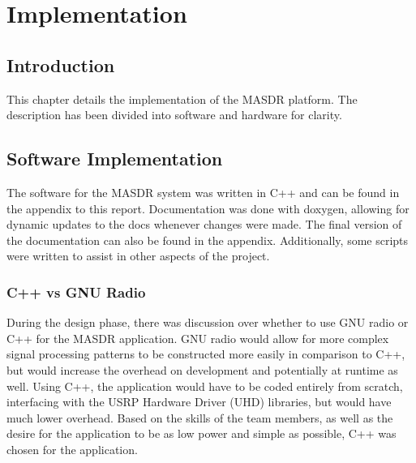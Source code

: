 \chapter{Implementation}

\section{Introduction}
This chapter details the implementation of the MASDR platform. The description has been divided into software and hardware for clarity.

\section{Software Implementation}
The software for the MASDR system was written in C++ and can be found in the appendix to this report. Documentation was done with doxygen, allowing for dynamic updates to the docs whenever changes were made. The final version of the documentation can also be found in the appendix. Additionally, some scripts were written to assist in other aspects of the project.
\subsection{C++ vs GNU Radio}
During the design phase, there was discussion over whether to use GNU radio or C++ for the MASDR application. GNU radio would allow for more complex signal processing patterns to be constructed more easily in comparison to C++, but would increase the overhead on development and potentially at runtime as well. Using C++, the application would have to be coded entirely from scratch, interfacing with the USRP Hardware Driver (UHD) libraries, but would have much lower overhead. Based on the skills of the team members, as well as the desire for the application to be as low power and simple as possible, C++ was chosen for the application.
